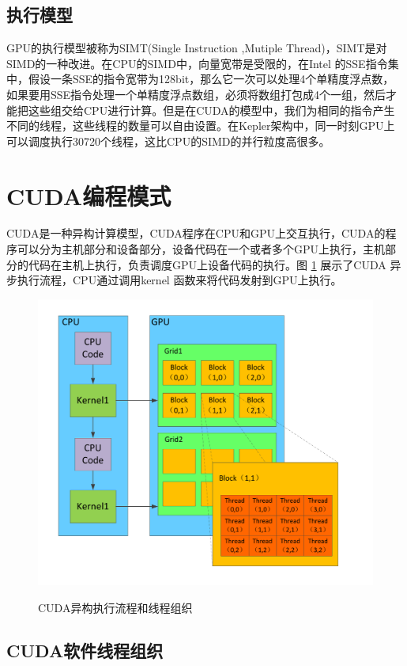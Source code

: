 \subsection{执行模型}
GPU的执行模型被称为SIMT(Single Instruction ,Mutiple Thread)，SIMT是对SIMD的一种改进。在CPU的SIMD中，向量宽带是受限的，在Intel 的SSE指令集中，假设一条SSE的指令宽带为128bit，那么它一次可以处理4个单精度浮点数，如果要用SSE指令处理一个单精度浮点数组，必须将数组打包成4个一组，然后才能把这些组交给CPU进行计算。但是在CUDA的模型中，我们为相同的指令产生不同的线程，这些线程的数量可以自由设置。在Kepler架构中，同一时刻GPU上可以调度执行30720个线程，这比CPU的SIMD的并行粒度高很多。

\section{CUDA编程模式}
CUDA是一种异构计算模型，CUDA程序在CPU和GPU上交互执行，CUDA的程序可以分为主机部分和设备部分，设备代码在一个或者多个GPU上执行，主机部分的代码在主机上执行，负责调度GPU上设备代码的执行。图 \ref{ktz} 展示了CUDA 异步执行流程，CPU通过调用kernel 函数来将代码发射到GPU上执行。
\begin{figure}
\setlength{\belowcaptionskip}{-0.5cm}
\begin{center}
{\includegraphics[width=1 \textwidth]{figures/block.pdf}}
\end{center}
\caption{{\footnotesize{CUDA异构执行流程和线程组织}}}
\label{ktz}
\end{figure}
\subsection{CUDA软件线程组织}

